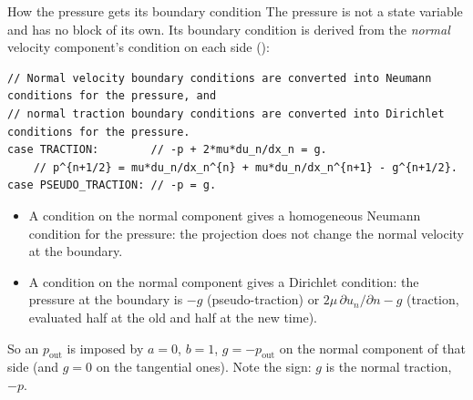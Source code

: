 \documentclass[aspectratio=169,11pt]{beamer}
\begin{document}
\begin{frame}[fragile]{How the pressure gets its boundary condition}
\label{fr:pressure}
\small The pressure is not a state variable and has no block of its own. Its boundary condition is derived from the \emph{normal} velocity component's condition on each side ():
\begin{lstlisting}[style=cpp]
// Normal velocity boundary conditions are converted into Neumann conditions for the pressure, and
// normal traction boundary conditions are converted into Dirichlet conditions for the pressure.
case TRACTION:        // -p + 2*mu*du_n/dx_n = g.
    // p^{n+1/2} = mu*du_n/dx_n^{n} + mu*du_n/dx_n^{n+1} - g^{n+1/2}.
case PSEUDO_TRACTION: // -p = g.
\end{lstlisting}
\begin{itemize}
  \item A  condition on the normal component gives a homogeneous Neumann condition for the pressure: the projection does not change the normal velocity at the boundary.
  \item A  condition on the normal component gives a Dirichlet condition: the pressure at the boundary is $-g$ (pseudo-traction) or $2\mu\,\partial u_n/\partial n - g$ (traction, evaluated half at the old and half at the new time).
\end{itemize}
\begin{punchbox}
\small So an  $p_{\mathrm{out}}$ is imposed by $a = 0$, $b = 1$, $g = -p_{\mathrm{out}}$ on the normal component of that side (and $g = 0$ on the tangential ones). Note the sign: $g$ is the normal traction, $-p$.
\end{punchbox}
\end{frame}
\end{document}
